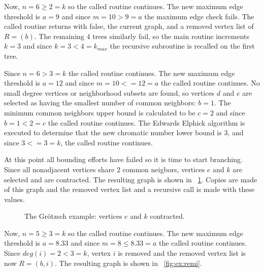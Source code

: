 Now, \(n=6\ge2=k\) so the called routine continues.  The new maximum edge threshold is \(a=9\) and since
\(m=10>9=a\) the maximum edge check fails.  The called routine returns with false, the current graph, and a removed
vertex list of \(R=(b)\).  The remaining \(4\) trees similarly fail, so the main routine increments \(k=3\) and
since \(k=3<4=k_{max}\) the recursive subroutine is recalled on the first tree.

Since \(n=6>3=k\) the called routine continues.  The new maximum edge threshold is \(a=12\) and since
\(m=10<=12=a\) the called routine continues.  No small degree vertices or neighborhood subsets are found, so
vertices \(d\) and \(e\) are selected as having the smallest number of common neighbors: \(b=1\).  The minimum
common neighbors upper bound is calculated to be \(c=2\) and since \(b=1<2=c\) the called routine continues.
The Edwards Elphick algorithm is executed to determine that the new chromatic number lower bound is \(3\), and
since \(3<=3=k\), the called routine continues.

At this point all bounding efforts have failed so it is time to start branching.  Since all nonadjacent vertices
share \(2\) common neigbors, vertices \(e\) and \(k\) are selected and are contracted.  The resulting graph is
shown in \figurename~\ref{fig:ex:conek}.  Copies are made of this graph and the removed vertex list and a recursive
call is made with these values.

\begin{figure}[H]
  \centering
  \caption{The Gr\"otzsch example: vertices \(e\) and \(k\) contracted.}
  \label{fig:ex:conek}
\end{figure}

Now, \(n=5\ge3=k\) so the called routine continues.  The new maximum edge threshold is \(a=8.33\) and since
\(m=8\le8.33=a\) the called routine continues.  Since \(deg(i)=2<3=k\), vertex \(i\) is removed and the removed
vertex list is now \(R=(b,i)\).  The resulting graph is shown in \figurename~\ref{fig:ex:remi}.

